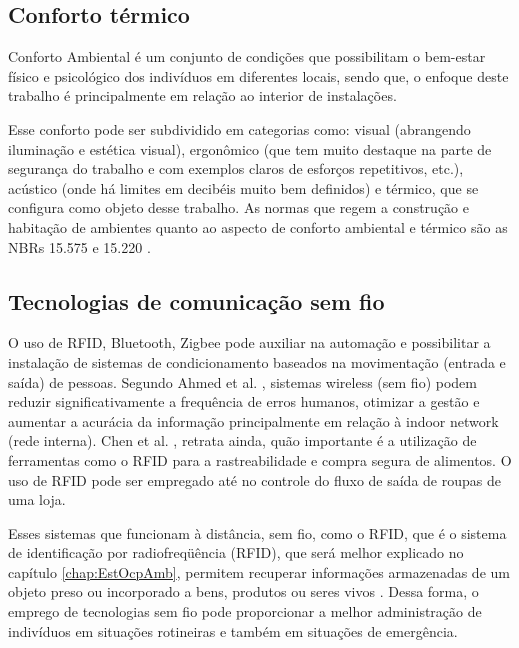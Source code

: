 \subsection{Conforto térmico}

Conforto Ambiental é um conjunto de condições que possibilitam o bem-estar físico e psicológico dos indivíduos em diferentes locais, sendo que, o enfoque deste trabalho é principalmente em relação ao interior de instalações.


Esse conforto pode ser subdividido em categorias como: visual (abrangendo iluminação e estética visual), ergonômico (que tem muito destaque na parte de segurança do trabalho e com exemplos claros de esforços repetitivos, etc.), acústico (onde há limites em decibéis muito bem definidos) e térmico, que se configura como objeto desse trabalho. As normas que regem a construção e habitação de ambientes quanto ao aspecto de conforto ambiental e térmico são as NBRs 15.575 \cite{NBR15575} e 15.220 \cite{NBR15220}.

\subsection{Tecnologias de comunicação sem fio}

O uso de RFID, Bluetooth, Zigbee pode auxiliar na automação e possibilitar a instalação de sistemas de condicionamento baseados na movimentação (entrada e saída) de pessoas. Segundo Ahmed et al. \cite{AhmedIntegrationStreamMapping}, sistemas wireless (sem fio) podem reduzir significativamente a frequência de erros humanos, otimizar a gestão e aumentar a acurácia da informação principalmente em relação à indoor network (rede interna). Chen et al. \cite{chenUsingRFID}, retrata ainda, quão importante é a utilização de ferramentas como o RFID para a rastreabilidade e compra segura de alimentos. O uso de RFID pode ser empregado até no controle do fluxo de saída de roupas de uma loja.

Esses sistemas que funcionam à distância, sem fio, como o RFID, que é o sistema de identificação por radiofreqüência (RFID), que será melhor explicado no capítulo \ref{chap:EstOcpAmb}, permitem recuperar informações armazenadas de um objeto preso ou incorporado a bens, produtos ou seres vivos \cite{gutierrez2005complexo}. Dessa forma, o emprego de tecnologias sem fio pode proporcionar a melhor administração de indivíduos em situações rotineiras e também em situações de emergência. 


